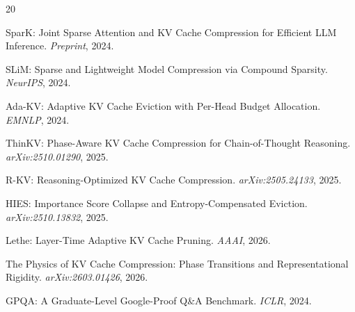 \documentclass[11pt,a4paper]{article}
\begin{document}
\begin{thebibliography}{20}

SparK: Joint Sparse Attention and KV Cache Compression for Efficient LLM Inference. \emph{Preprint}, 2024.

SLiM: Sparse and Lightweight Model Compression via Compound Sparsity. \emph{NeurIPS}, 2024.

Ada-KV: Adaptive KV Cache Eviction with Per-Head Budget Allocation. \emph{EMNLP}, 2024.

ThinKV: Phase-Aware KV Cache Compression for Chain-of-Thought Reasoning. \emph{arXiv:2510.01290}, 2025.

R-KV: Reasoning-Optimized KV Cache Compression. \emph{arXiv:2505.24133}, 2025.

HIES: Importance Score Collapse and Entropy-Compensated Eviction. \emph{arXiv:2510.13832}, 2025.

Lethe: Layer-Time Adaptive KV Cache Pruning. \emph{AAAI}, 2026.

The Physics of KV Cache Compression: Phase Transitions and Representational Rigidity. \emph{arXiv:2603.01426}, 2026.

GPQA: A Graduate-Level Google-Proof Q\&A Benchmark. \emph{ICLR}, 2024.

\end{thebibliography}
\end{document}
